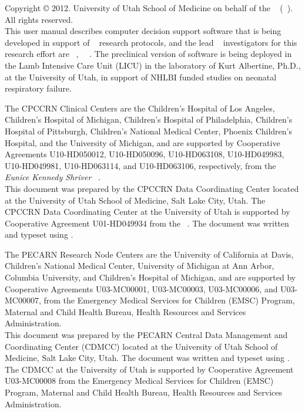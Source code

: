 \pagebreak
Copyright \copyright{} 2012. University of Utah School of Medicine on
behalf of the \network~ (\abb~).
All rights reserved. \\

This user manual describes computer decision support software that is being 
developed in support of \abb~ research protocols, and the 
lead \abb~ investigators for this research effort
are \leadPI~, ~\leadinstitution~. The preclinical version of software
is being deployed in the Lamb Intensive Care Unit (LICU) in the laboratory of
Kurt Albertine, Ph.D., at the University of Utah, in support of NHLBI
funded studies on neonatal respiratory failure.\\




{
The CPCCRN Clinical Centers are
 the Children's Hospital of Los Angeles, Children's Hospital of Michigan, Children's Hospital of Philadelphia, Children's Hospital of Pittsburgh, Children's National Medical Center, Phoenix Children's Hospital, and the University of Michigan, and are supported by Cooperative Agreements U10-HD050012, U10-HD050096, U10-HD063108, U10-HD049983, U10-HD049981, U10-HD063114, and U10-HD063106, respectively, from the \emph{Eunice Kennedy Shriver} \funder~. \\

 This document was prepared by the CPCCRN Data Coordinating Center located at
 the University of Utah School of Medicine, Salt Lake City, Utah.  The CPCCRN Data Coordinating Center at the University of Utah
 is supported by Cooperative Agreement U01-HD049934 from the
 \funder~.
 The document was
 written and typeset using \LaTeXe.

}{}

{
The PECARN Research Node Centers are
the University of California at Davis,  Children's National
Medical Center, University of Michigan at Ann Arbor, Columbia University,
and Children's Hospital of Michigan, and
are supported by Cooperative Agreements U03-MC00001, U03-MC00003,
U03-MC00006, and U03-MC00007,
from the Emergency Medical Services for Children (EMSC) Program, Maternal
and Child Health Bureau, Health Resources and Services Administration. \\

 This document was prepared by the PECARN Central  Data Management
 and Coordinating Center
 (CDMCC) located at
 the University of Utah School of Medicine, Salt Lake City, Utah.  The document was
 written and typeset using \LaTeXe.
 The CDMCC at the University of Utah
 is supported by Cooperative Agreement U03-MC00008   from the
 Emergency Medical Services for Children (EMSC) Program, Maternal
  and Child Health Bureau, Health Resources and Services Administration.
  }{}
  
